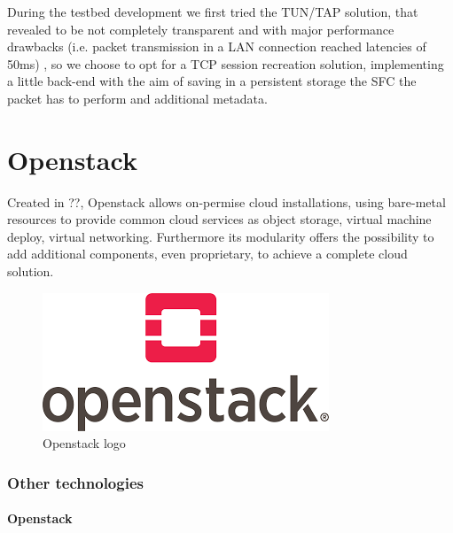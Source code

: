\documentclass[10pt]{book}
\begin{document}
During the testbed development we first tried the TUN/TAP solution, that 
revealed to be not completely transparent and with major performance drawbacks 
(i.e. packet transmission in a LAN connection reached latencies of 50ms) 
, so we choose to opt for a TCP session recreation solution, 
implementing a little back-end with the aim of saving in a persistent storage 
the SFC the packet has to perform and additional metadata.


\section{Openstack}
\label{chap:prjan:sec:openstack}
Created in ??, 
Openstack allows on-permise cloud installations, using bare-metal resources to 
provide common cloud services as object storage, virtual machine deploy, 
virtual networking. Furthermore its modularity offers the possibility to add 
additional components, even proprietary, to achieve a complete cloud solution.
\begin{figure}[t]
 \centering
 \includegraphics[scale=0.58]{openstack_logo}
 \caption{Openstack logo}
 \label{chap:prjan:img:openstack_logo}
\end{figure}








\subsubsection{Other technologies}
\paragraph{Openstack}
\end{document}
